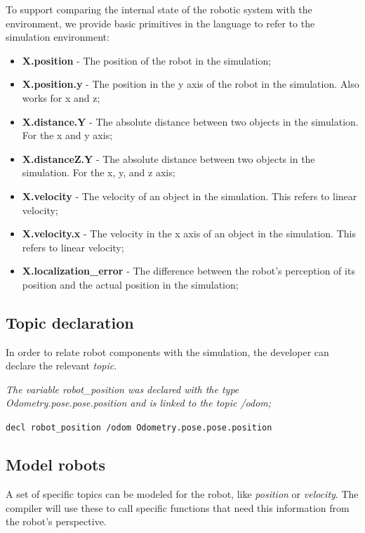 \documentclass[runningheads]{llncs}
\begin{document}
To support comparing the internal state of the robotic system with the environment, we provide basic primitives in the language to refer to the simulation environment:

\begin{itemize}
\item {\bfseries X.position} - The position of the robot in the simulation;
\item {\bfseries X.position.y} - The position in the y axis of the robot in the simulation. Also works for x and z;
\item {\bfseries X.distance.Y} - The absolute distance between two objects in the simulation. For the x and y axis;
\item {\bfseries X.distanceZ.Y} - The absolute distance between two objects in the simulation. For the x, y, and z axis;
\item {\bfseries X.velocity} - The velocity of an object in the simulation. This refers to linear velocity;
\item {\bfseries X.velocity.x} - The velocity in the x axis of an object in the simulation. This refers to linear velocity;
\item {\bfseries X.localization\_error} - The difference between the robot's perception of its position and the actual position in the simulation;
\end{itemize}


\subsection{Topic declaration}

In order to relate robot components with the simulation, the developer can declare the relevant \textit{topic}.

\textit{The variable robot\_position was declared with the type Odometry.pose.pose.position and is linked to the topic /odom;}

\vspace{2mm}

\texttt{decl robot\_position /odom Odometry.pose.pose.position}


\subsection{Model robots}

A set of specific topics can be modeled for the robot, like \textit{position} or \textit{velocity}. The compiler will use these to call specific functions that need this information from the robot's perspective.
\end{document}
